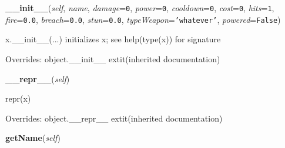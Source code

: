     \vspace{0.5ex}

\hspace{.8\funcindent}\begin{boxedminipage}{\funcwidth}

    \raggedright \textbf{\_\_init\_\_}(\textit{self}, \textit{name}, \textit{damage}={\tt 0}, \textit{power}={\tt 0}, \textit{cooldown}={\tt 0}, \textit{cost}={\tt 0}, \textit{hits}={\tt 1}, \textit{fire}={\tt 0.0}, \textit{breach}={\tt 0.0}, \textit{stun}={\tt 0.0}, \textit{typeWeapon}={\tt \texttt{'}\texttt{whatever}\texttt{'}}, \textit{powered}={\tt False})

\setlength{\parskip}{2ex}
    x.\_\_init\_\_(...) initializes x; see help(type(x)) for signature

\setlength{\parskip}{1ex}
      Overrides: object.\_\_init\_\_ 	extit{(inherited documentation)}

    \end{boxedminipage}

    \vspace{0.5ex}

\hspace{.8\funcindent}\begin{boxedminipage}{\funcwidth}

    \raggedright \textbf{\_\_repr\_\_}(\textit{self})

\setlength{\parskip}{2ex}
    repr(x)

\setlength{\parskip}{1ex}
      Overrides: object.\_\_repr\_\_ 	extit{(inherited documentation)}

    \end{boxedminipage}

    \label{weapon_module_WIP:Weapon:getName}

    \vspace{0.5ex}

\hspace{.8\funcindent}\begin{boxedminipage}{\funcwidth}

    \raggedright \textbf{getName}(\textit{self})

\setlength{\parskip}{2ex}
\setlength{\parskip}{1ex}
    \end{boxedminipage}

    \label{weapon_module_WIP:Weapon:getType}

